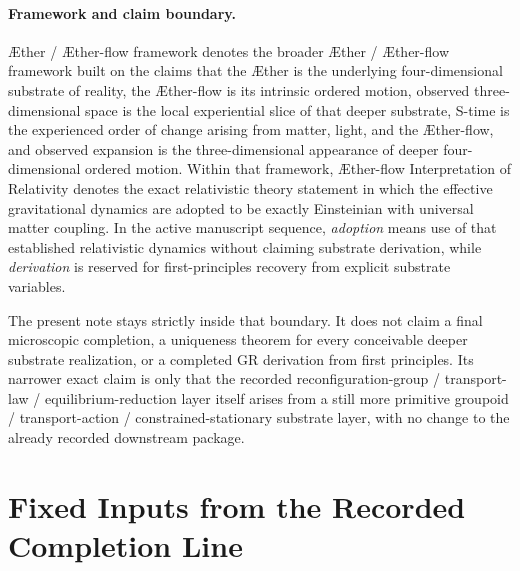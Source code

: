 \documentclass[11pt]{article}
\newcommand{\Aether}{\AE{}ther}
\newcommand{\Aflow}{\AE{}ther-flow}
\newcommand{\TheoryName}{\Aflow{} Interpretation of Relativity}
\newcommand{\TheoryProgram}{\Aether{} / \Aflow{} framework}
\begin{document}
\paragraph{Framework and claim boundary.}
\TheoryProgram{} denotes the broader \Aether{} / \Aflow{} framework built on the claims that the \Aether{} is the underlying four-dimensional substrate of reality, the \Aflow{} is its intrinsic ordered motion, observed three-dimensional space is the local experiential slice of that deeper substrate, S-time is the experienced order of change arising from matter, light, and the \Aflow{}, and observed expansion is the three-dimensional appearance of deeper four-dimensional ordered motion. Within that framework, \TheoryName{} denotes the exact relativistic theory statement in which the effective gravitational dynamics are adopted to be exactly Einsteinian with universal matter coupling. In the active manuscript sequence, \emph{adoption} means use of that established relativistic dynamics without claiming substrate derivation, while \emph{derivation} is reserved for first-principles recovery from explicit substrate variables.

The present note stays strictly inside that boundary. It does not claim a final microscopic completion, a uniqueness theorem for every conceivable deeper substrate realization, or a completed GR derivation from first principles. Its narrower exact claim is only that the recorded reconfiguration-group / transport-law / equilibrium-reduction layer itself arises from a still more primitive groupoid / transport-action / constrained-stationary substrate layer, with no change to the already recorded downstream package.

\section{Fixed Inputs from the Recorded Completion Line}
\end{document}
